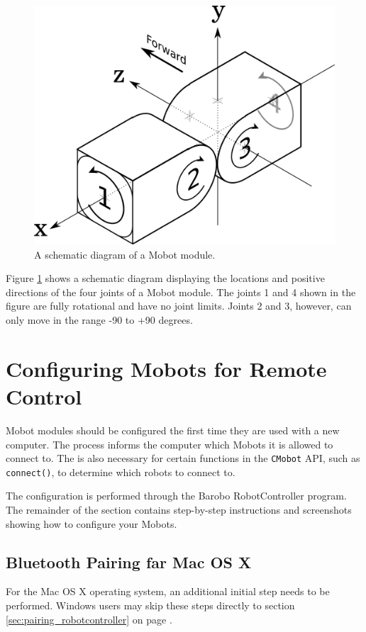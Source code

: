 \documentclass{article}
\begin{document}
\begin{figure}[H]
\begin{center}
\includegraphics[width=4.5in]{images/joint_diagram_verbose.png}
\end{center}
\caption{\label{fig:joint_diagram_verbose.png} A schematic diagram of a Mobot module.}
\end{figure}

Figure \ref{fig:joint_diagram_verbose.png} shows a schematic diagram displaying the
locations and positive directions of the four joints of a Mobot module. The
joints 1 and 4 shown in the figure are fully rotational and have no joint limits.
Joints 2 and 3, however, can only move in the range -90 to +90 degrees.

\section{\label{sec:pairing}Configuring Mobots for Remote Control}
Mobot modules should be configured the first time they are used with 
a new computer. The process informs the computer which Mobots it
is allowed to connect to. The is also necessary for certain 
functions in the \texttt{CMobot} API, such as \texttt{connect()},
to determine which robots to connect to.

The configuration is performed through the Barobo RobotController
program. The remainder of the section contains step-by-step instructions
and screenshots showing how to configure your Mobots.

\subsection{Bluetooth Pairing far Mac OS X}
For the Mac OS X operating system, an additional initial step needs to be performed.
Windows users may skip these steps directly to section \ref{sec:pairing_robotcontroller}
on page \pageref{sec:pairing_robotcontroller}.
\end{document}
